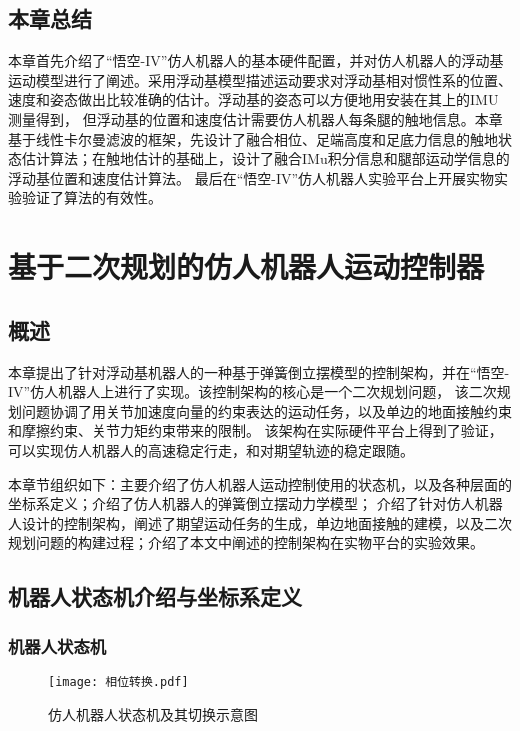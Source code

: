 \section{本章总结}
本章首先介绍了“悟空-IV”仿人机器人的基本硬件配置，并对仿人机器人的浮动基运动模型进行了阐述。采用浮动基模型描述运动要求对浮动基相对惯性系的位置、速度和姿态做出比较准确的估计。浮动基的姿态可以方便地用安装在其上的IMU测量得到，
但浮动基的位置和速度估计需要仿人机器人每条腿的触地信息。本章基于线性卡尔曼滤波的框架，先设计了融合相位、足端高度和足底力信息的触地状态估计算法；在触地估计的基础上，设计了融合IMu积分信息和腿部运动学信息的浮动基位置和速度估计算法。
最后在“悟空-IV”仿人机器人实验平台上开展实物实验验证了算法的有效性。
\chapter{基于二次规划的仿人机器人运动控制器}
\section{概述}
本章提出了针对浮动基机器人的一种基于弹簧倒立摆模型的控制架构，并在“悟空-IV”仿人机器人上进行了实现。该控制架构的核心是一个二次规划问题，
该二次规划问题协调了用关节加速度向量的约束表达的运动任务，以及单边的地面接触约束和摩擦约束、关节力矩约束带来的限制。
该架构在实际硬件平台上得到了验证，可以实现仿人机器人的高速稳定行走，和对期望轨迹的稳定跟随。

本章节组织如下：主要介绍了仿人机器人运动控制使用的状态机，以及各种层面的坐标系定义；介绍了仿人机器人的弹簧倒立摆动力学模型；
介绍了针对仿人机器人设计的控制架构，阐述了期望运动任务的生成，单边地面接触的建模，以及二次规划问题的构建过程；介绍了本文中阐述的控制架构在实物平台的实验效果。
\section{机器人状态机介绍与坐标系定义}
\label{sec:state_machine}
\subsection{机器人状态机}

\begin{figure}[htbp]
    \centering
    \texttt{[image: 相位转换.pdf]}
    \caption{\label{fig:state_machine}仿人机器人状态机及其切换示意图}
\end{figure}

